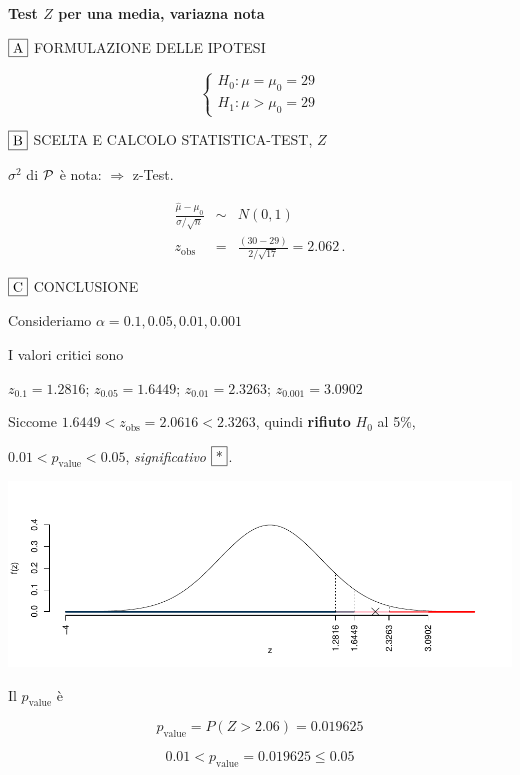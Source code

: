 \documentclass[
  11pt,
]{book}
\theoremstyle{mytheoremstyle}
\theoremstyle{mydefstyle}
\newenvironment{sol}
  {
  \begin{tcolorbox}[enhanced,breakable,arc=0.1mm,boxrule=1pt,colback=white,colframe=iblue,
  title=\bf \fontfamily{lmss}\selectfont \hspace{.5 cm} Soluzione,drop fuzzy shadow]

}{
\end{tcolorbox}
  }
\begin{document}
\begin{sol}
\textbf{Test \(Z\) per una media, variazna nota}

\(\fbox{A}\) FORMULAZIONE DELLE IPOTESI

\[\begin{cases}
   H_0: \mu = \mu_0=29 \\
   H_1: \mu > \mu_0=29 
   \end{cases}\]

\(\fbox{B}\) SCELTA E CALCOLO STATISTICA-TEST, \(Z\)

\(\sigma^{2}\) di \(\cal{P}\) è nota: \(\Rightarrow\) z-Test.

\begin{eqnarray*}
   \frac{\hat\mu - \mu_{0}} {\sigma/\sqrt{n}}&\sim&N(0,1)\\
   z_{\text{obs}}
   &=& \frac{ ( 30 -  29 )} { 2 /\sqrt{ 17 }}
   =   2.062 \, .
   \end{eqnarray*}

\(\fbox{C}\) CONCLUSIONE

Consideriamo \(\alpha=0.1, 0.05, 0.01, 0.001\)

I valori critici sono

\(z_{0.1}=1.2816\); \(z_{0.05}=1.6449\); \(z_{0.01}=2.3263\); \(z_{0.001}=3.0902\)

Siccome \(1.6449<z_\text{obs}=2.0616<2.3263\), quindi \textbf{rifiuto} \(H_0\) al 5\%,

\(0.01<p_\text{value}<0.05\), \emph{significativo} \(\fbox{*}\).

\begin{center}\includegraphics{Esami_passati_con_soluzioni_files/figure-latex/05-test-2,-1} \end{center}

Il \(p_{\text{value}}\) è

\[ p_{\text{value}} = P(Z>2.06)=0.019625 \]

\[
 0.01 < p_\text{value}= 0.019625 \leq 0.05 
\]

\end{sol}
\end{document}
